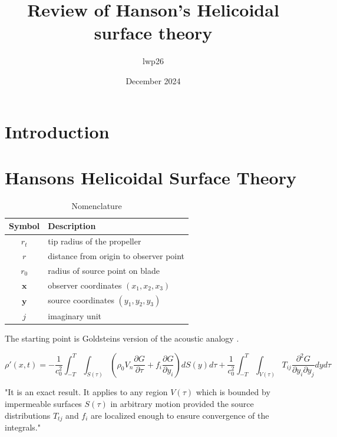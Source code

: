 \documentclass[8pt]{article}
\begin{document}
\title{Review of Hanson's Helicoidal surface theory}
\author{lwp26}
\date{December 2024}
\maketitle

\section{Introduction}

\section{Hansons Helicoidal Surface Theory}

\begin{table}[H]
    \centering
    \begin{tabular}{c l}
        \hline
        Symbol & Description \\
        \hline
        $r_t$ & tip radius of the propeller \\
        $r$ & distance from origin to observer point \\
        $r_0$ &  radius of source point on blade \\
        $\mathbf{x}$ & observer coordinates $(x_1, x_2, x_3)$ \\
        $\mathbf{y}$ & source coordinates $(y_1, y_2, y_3)$ \\
        $j$ & imaginary unit \\
        \hline
    \end{tabular}
    \caption{Nomenclature}
    \label{tab:nomenclature}
\end{table}

The starting point is Goldsteins version of the acoustic analogy \cite{goldstein_aeroacoustics}.

\begin{equation}
    \rho'(x, t) = -\frac{1}{c_0^2} \int_{-T}^T \int_{S(\tau)} \left( \rho_0 V_n \frac{\partial G}{\partial \tau} + f_i \frac{\partial G}{\partial y_i} \right) dS(y) d\tau
    + \frac{1}{c_0^2} \int_{-T}^T \int_{V(\tau)} T_{ij} \frac{\partial^2 G}{\partial y_i \partial y_j} dy d\tau
    \label{eq:goldstein}
\end{equation}

"It is an exact result. It applies to any
region $V(\tau)$ which is bounded by impermeable surfaces $S(\tau)$
in arbitrary motion provided the source distributions $T_{tj}$ and
$f_i$ are localized enough to ensure convergence of the integrals."
\end{document}
